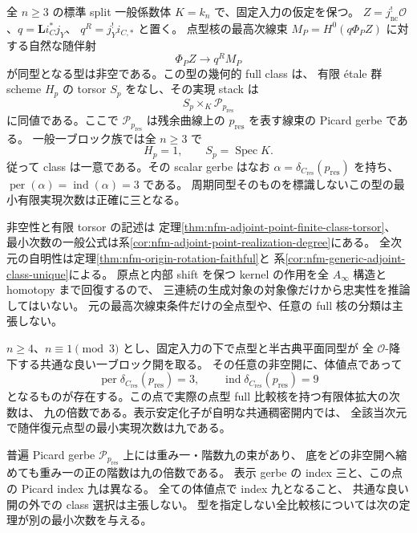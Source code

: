\begin{maintheorem}
\label{main:nfm-finite-adjoint-point-classes}
全 $n\ge3$ の標準 split 一般係数体 $K=k_n$ で、固定入力の仮定を保つ。
$Z=j_{\mathrm{nc}}^!\mathcal O$、$q=\mathbf Li_C^*j_Y$、
$q^R=j_Y^!i_{C,*}$ と置く。
点型核の最高次線束 $M_P=H^0(q\Phi_PZ)$ に対する自然な随伴射
\[
 \Phi_PZ\longrightarrow q^RM_P
\]
が同型となる型は非空である。この型の幾何的 full class は、
有限 \'etale 群 scheme $H_p$ の torsor $S_p$ をなし、その実現 stack は
\[
 S_p\times_K\mathscr P_{p_{\mathrm{res}}}
\]
に同値である。ここで $\mathscr P_{p_{\mathrm{res}}}$ は残余曲線上の
$p_{\mathrm{res}}$ を表す線束の Picard gerbe である。
一般一ブロック族では全 $n\ge3$ で
\[
 H_p=1,\qquad S_p=\operatorname{Spec}K.
\]
従って class は一意である。その scalar gerbe はなお
$\alpha=\delta_{C_{\mathrm{res}}}(p_{\mathrm{res}})$ を持ち、
$\operatorname{per}(\alpha)=\operatorname{ind}(\alpha)=3$ である。
周期同型そのものを標識しないこの型の最小有限実現次数は正確に三となる。
\end{maintheorem}

非空性と有限 torsor の記述は
定理\ref{thm:nfm-adjoint-point-finite-class-torsor}、
最小次数の一般公式は系\ref{cor:nfm-adjoint-point-realization-degree}にある。
全次元の自明性は定理\ref{thm:nfm-origin-rotation-faithful}と
系\ref{cor:nfm-generic-adjoint-class-unique}による。
原点と内部 shift を保つ kernel の作用を全 $A_\infty$ 構造と homotopy まで回復するので、
三連続の生成対象の対象像だけから忠実性を推論してはいない。
元の最高次線束条件だけの全点型や、任意の full 核の分類は主張しない。

\begin{maintheorem}[非分裂点型の指数九と普遍階数の最小性]
\label{main:nfm-unsplit-picard-index-nine}
$n\ge4$、$n\equiv1\pmod3$ とし、固定入力の下で点型と半古典平面同型が
全 $\mathcal O$-降下する共通な良い一ブロック開を取る。
その任意の非空開に、体値点であって
\[
 \operatorname{per}\delta_{C_{\mathrm{res}}}(p_{\mathrm{res}})=3,
 \qquad\operatorname{ind}\delta_{C_{\mathrm{res}}}(p_{\mathrm{res}})=9
\]
となるものが存在する。この点で実際の点型 full 比較核を持つ有限体拡大の次数は、
九の倍数である。表示安定化子が自明な共通稠密開内では、
全該当次元で随伴復元点型の最小実現次数は九である。

普遍 Picard gerbe $\mathscr P_{p_{\mathrm{res}}}$ 上には重み一・階数九の束があり、
底をどの非空開へ縮めても重み一の正の階数は九の倍数である。
表示 gerbe の index 三と、この点の Picard index 九は異なる。
全ての体値点で index 九となること、
共通な良い開の外での class 選択は主張しない。
型を指定しない全比較核については次の定理が別の最小次数を与える。
\end{maintheorem}

